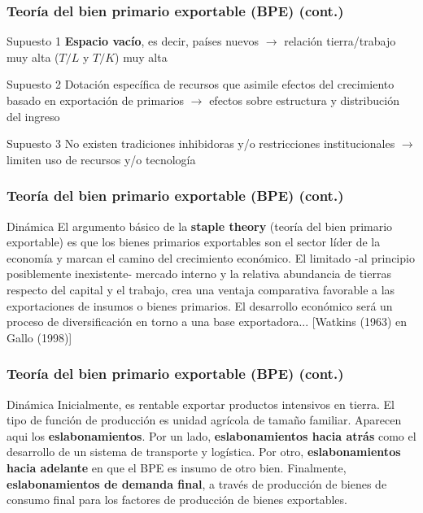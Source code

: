 \documentclass[14pt,aspectratio=169]{beamer}
\begin{document}
\begin{frame}\frametitle{Teoría del bien primario exportable (BPE) (cont.)}
  \begin{block}{Supuesto 1}
\textbf{Espacio vacío}, es decir, países nuevos
$\longrightarrow$ relación tierra/trabajo muy alta ($T/L$ y $T/K$) muy alta 
\end{block}
\begin{block}{Supuesto 2}
Dotación específica de recursos que asimile efectos del
crecimiento basado en exportación de primarios
$\longrightarrow$ efectos sobre estructura y distribución del ingreso
\end{block}
\begin{block}{Supuesto 3}
No existen tradiciones inhibidoras y/o restricciones institucionales $\longrightarrow$ limiten uso de recursos y/o tecnología
  \end{block}
  \end{frame}



\begin{frame}\frametitle{Teoría del bien primario exportable (BPE) (cont.)}
  \begin{block}{Dinámica}
    El argumento básico de la \textbf{staple theory} (teoría del bien
    primario exportable) es que los bienes primarios exportables son
    el sector líder de la economía y marcan el camino del crecimiento
    económico. El limitado -al principio posiblemente inexistente-
    mercado interno y la relativa abundancia de tierras respecto del
    capital y el trabajo, crea una ventaja comparativa favorable a las
    exportaciones de insumos o bienes primarios. El desarrollo
    económico será un proceso de diversificación en torno a una base
    exportadora... [Watkins (1963) en Gallo (1998)]
  \end{block}
  \end{frame}
  

\begin{frame}\frametitle{Teoría del bien primario exportable (BPE) (cont.)}
  \begin{block}{Dinámica}
    Inicialmente, es rentable exportar productos intensivos en
    tierra. El tipo de función de producción es unidad agrícola de
    tamaño familiar. Aparecen aqui los
    \textbf{eslabonamientos}. Por un lado, \textbf{eslabonamientos hacia atrás}
    como el desarrollo de un sistema de transporte y
    logística. Por otro, \textbf{eslabonamientos hacia adelante} en
    que el BPE es insumo de otro bien. Finalmente,
    \textbf{eslabonamientos de demanda final}, a través de producción
    de bienes de consumo final para los factores de producción de
    bienes exportables.  
  \end{block}
  \end{frame}
\end{document}
